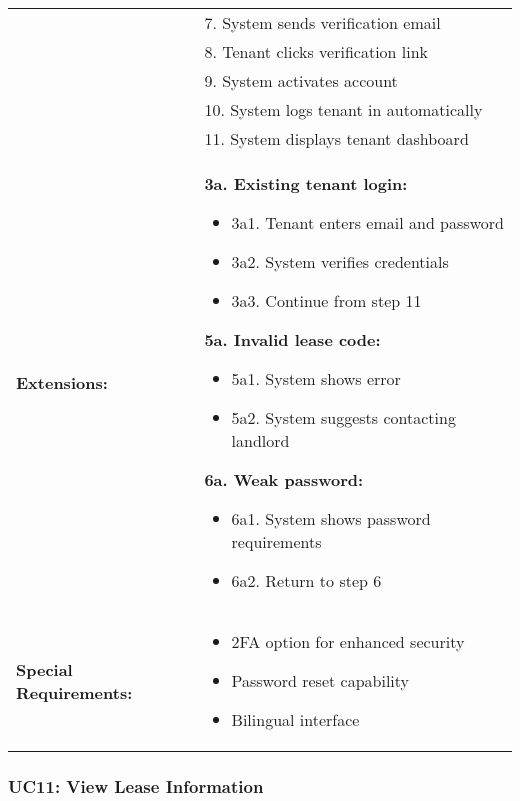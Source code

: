 \documentclass[12pt]{article}
\begin{document}
\begin{longtable}{|p{3cm}|p{11cm}|}
& 7. System sends verification email \\
& 8. Tenant clicks verification link \\
& 9. System activates account \\
& 10. System logs tenant in automatically \\
& 11. System displays tenant dashboard \\
\hline
\textbf{Extensions:} & 
\textbf{3a. Existing tenant login:}
\begin{itemize}
    \item 3a1. Tenant enters email and password
    \item 3a2. System verifies credentials
    \item 3a3. Continue from step 11
\end{itemize}
\textbf{5a. Invalid lease code:}
\begin{itemize}
    \item 5a1. System shows error
    \item 5a2. System suggests contacting landlord
\end{itemize}
\textbf{6a. Weak password:}
\begin{itemize}
    \item 6a1. System shows password requirements
    \item 6a2. Return to step 6
\end{itemize} \\
\hline
\textbf{Special Requirements:} & 
\begin{itemize}
    \item 2FA option for enhanced security
    \item Password reset capability
    \item Bilingual interface
\end{itemize} \\
\hline
\end{longtable}

\subsubsection{UC11: View Lease Information}
\end{document}
